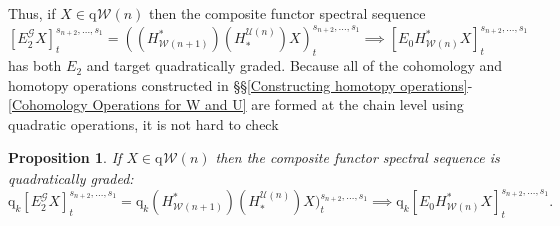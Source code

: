 \documentclass[11pt]{amsart} \renewcommand{\baselinestretch}{1.4}
\theoremstyle{plain}
\newtheorem{prop}[thm]{Proposition}
\theoremstyle{definition}
\newcommand{\scrG}{\mathscr{G}}
\newcommand{\calU}{\mathcal{U}}
\newcommand{\calw}{\mathcal{W}}
\newcommand{\BSW}{{\scrG}}
\newcommand{\quadgrad}[1]{\mathrm{q}_{#1}}
\newcommand{\E}[5]{[E^{#1}_{#2}#3]^{#4}_{#5}}
\newcommand{\Edown}[4]{[E_{#1}#2]^{#3}_{#4}}
\begin{document}
\begin{Composite functor spectral sequences}
Thus, if $X\in\quadgrad{}\calw(n)$ then the composite functor spectral sequence
\[\E{\BSW}{2}{X}{s_{n+2},\ldots,s_1}{t}=((H^*_{\calw(n+1)})(H_*^{\calU(n)})X)^{s_{n+2},\ldots,s_1}_t\implies \Edown{0}{H^*_{\calw(n)}X}{s_{n+2},\ldots,s_1}{t}\]
has both $E_2$ and target quadratically graded. Because all of the cohomology and homotopy operations constructed in \S\S\ref{Constructing homotopy operations}-\ref{Cohomology Operations for W and U} are formed at the chain level using quadratic operations, it is not hard to check
\begin{prop}
\label{prop: cfsseq is quad graded}
If $X\in\quadgrad{}\calw(n)$ then the composite functor spectral sequence is quadratically graded:
\[\quadgrad{k}\E{\BSW}{2}{X}{s_{n+2},\ldots,s_1}{t}=\quadgrad{k}(H^*_{\calw(n+1)})(H_*^{\calU(n)})X)^{s_{n+2},\ldots,s_1}_t\implies \quadgrad{k}\Edown{0}{H^*_{\calw(n)}X}{s_{n+2},\ldots,s_1}{t}.\]
\end{prop}



\end{Composite functor spectral sequences}
\end{document}
